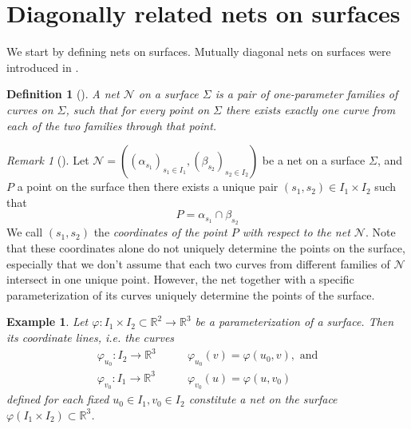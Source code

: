 \documentclass[10pt, a4paper]{article}
\theoremstyle{BoldTopSpacing}
\theoremstyle{BoldTopSpacing}
\theoremstyle{BoldTopSpacing}
\theoremstyle{BoldTopBottomSpacing}
\newtheorem{definition}{Definition}[section]
\theoremstyle{BoldTopSpacing}
\theoremstyle{BoldTopBottomSpacing}
\newtheorem{example}{Example}[section]
\theoremstyle{remark}
\newtheorem{remark}{\textit{Remark}}[section]
\begin{document}
\pagebreak
\section{Diagonally related nets on surfaces}
\label{sec:diagonally-related-nets}

We start by defining nets on surfaces. Mutually diagonal nets on surfaces were introduced in \cite{MutuallyDiagonalNets2019}.

\begin{definition}[]
\label{def:nets-on-surfaces}
A net $\mathcal{N}$ on a surface $\Sigma$ is a pair of one-parameter families of curves on $\Sigma$, such that for every point on $\Sigma$ there exists exactly one curve from each of the two families through that point.
\end{definition}

\begin{remark}[]
\label{rm:label}
Let $\mathcal{N} = \left( (\alpha_{s_{1}})_{s_{1} \in I_1}, (\beta_{s_{2}})_{s_{2} \in I_2} \right)$ be a net on a surface
$\Sigma$, and $P$ a point on the surface then there exists a unique pair $(s_{1}, s_{2}) \in I_{1}\times I_{2}$ such that
\[
    P = \alpha_{s_1} \cap \beta_{s_2}
\]
We call $(s_1, s_2)$ the \textit{coordinates of the point $P$ with respect to the net $\mathcal{N}$}. Note that these coordinates alone do not uniquely determine the points on the surface, especially that we don't assume that each two curves from different families of $\mathcal{N}$ intersect in one unique point. However, the net together with a specific parameterization of its curves uniquely determine the points of the surface.
\end{remark}

\begin{example}
\label{ex:coordinate-lines-form-net-on-surfaces}
Let $\varphi : I_{1} \times I_{2} \subset \mathbb{R}^2 \to \mathbb{R}^3$ be a parameterization of a surface. Then its
coordinate lines, i.e. the curves
\begin{align*}
    \varphi_{u_0} : I_{2} \to \mathbb{R}^3 &\quad \quad \varphi_{u_0}(v) = \varphi(u_0, v), \text{ and} \\
    \varphi_{v_0} : I_{1} \to \mathbb{R}^3 &\quad \quad \varphi_{v_0}(u) = \varphi(u, v_0)
\end{align*}
defined for each fixed $u_{0} \in I_1, v_{0} \in I_2$ constitute a net on the surface $\varphi\left( I_1 \times I_{2}
\right) \subset \mathbb{R}^3$.
\end{example}
\end{document}
